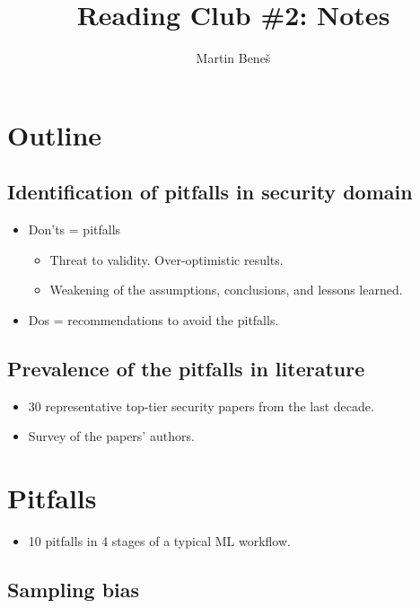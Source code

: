 \documentclass[11pt, oneside]{article}   	%
\title{Reading Club \#2: Notes}
\author{Martin Bene{\v s}}
\date{}
\begin{document}
\maketitle


\section{Outline}

\subsection{Identification of pitfalls in security domain}

\begin{itemize}
\item Don'ts = pitfalls
\begin{itemize}
\item Threat to validity. Over-optimistic results.
\item Weakening of the assumptions, conclusions, and lessons learned.
\end{itemize}
\item Dos = recommendations to avoid the pitfalls.
\end{itemize}

\subsection{Prevalence of the pitfalls in literature}

\begin{itemize}
\item 30 representative top-tier security papers from the last decade.
\item Survey of the papers' authors.
\end{itemize}


\section{Pitfalls}

\begin{itemize}
\item 10 pitfalls in 4 stages of a typical ML workflow.
\end{itemize}

\subsection{Sampling bias}	
\end{document}
